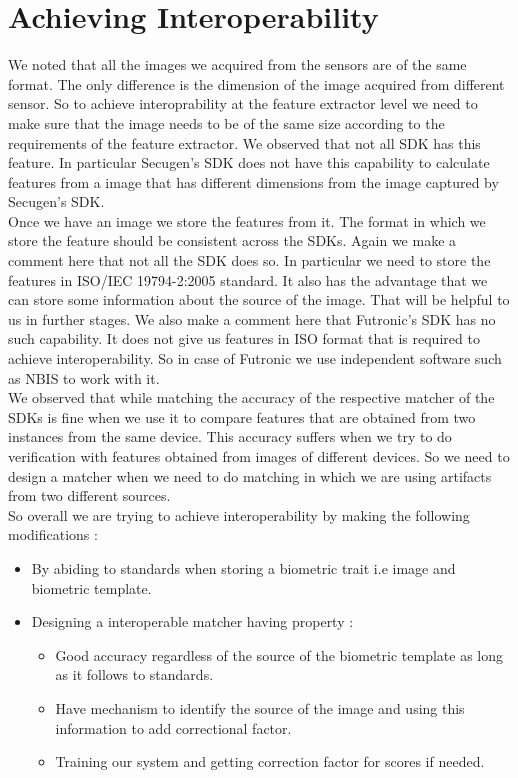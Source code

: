\documentclass{article}
\begin{document}
\section*{Achieving Interoperability}
We noted that all the images we acquired from the sensors are of the same format.
The only difference is the dimension of the image acquired from different sensor.
So to achieve interoprability at the feature extractor level we need to make sure that the image needs to be of the same size according to the requirements of the feature extractor. 
We observed that not all SDK has this feature. In particular Secugen's SDK does not have this capability to calculate features from a image that has different dimensions from the image captured by Secugen's SDK. \\
Once we have an image we store the features from it. 
The format in which we store the feature should be consistent across the SDKs. 
Again we make a comment  here that not all the SDK does so. In particular we need to store the features in ISO/IEC 19794-2:2005 standard. 
It also has the advantage that we can store some information about the source of the image. That will be helpful to us in further stages. 
We also make a comment here that Futronic's SDK has no such capability. It does not give us features in ISO format that is required to achieve interoperability. So in case of Futronic we use independent software such as NBIS to work with it. \\
We  observed that while matching the accuracy of the respective matcher of the SDKs is fine when we use it to compare features that are obtained from two instances from the same device. This accuracy suffers when we try to do verification with features obtained from images of different devices. So we need to design a matcher  when we need to do matching in which we are using artifacts from two different sources. \\
So overall we are trying to achieve interoperability by making the following modifications :
\begin{itemize}
	\item By abiding to standards when storing a biometric trait i.e image and biometric template.
	\item Designing a interoperable matcher having property :
		\begin{itemize}
			\item Good accuracy regardless of the source of the biometric template as long as it follows to standards.
			\item Have mechanism to identify the source of the image and using this information to add correctional factor.
			\item Training our system and getting correction factor for scores if needed.
		\end{itemize}
\end{itemize}
\end{document}

